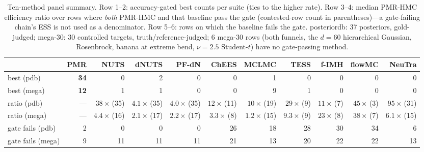 \documentclass[11pt]{article}
\theoremstyle{remark}
\begin{document}
\begin{table}[t]
\caption{Ten-method panel summary. Row 1--2: accuracy-gated best counts
per suite (ties to the higher rate). Row 3--4: median PMR-HMC
efficiency ratio over rows where \emph{both} PMR-HMC and that baseline
pass the gate (contested-row count in parentheses)---a gate-failing
chain's ESS is not used as a denominator. Row 5--6: rows on which the
baseline fails the gate. posteriordb: 37 posteriors, gold-judged;
mega-30: 30 controlled targets, truth/reference-judged; 6 mega-30 rows
(both funnels, the $d{=}60$ hierarchical Gaussian, Rosenbrock, banana
at extreme bend, $\nu{=}2.5$ Student-$t$) have no gate-passing method.}
\label{tab:panelsum}
\centering\scriptsize
\setlength{\tabcolsep}{2.6pt}
\begin{tabular}{lrrrrrrrrrr}
\toprule
 & PMR & NUTS & dNUTS & PF-dN & ChEES & MCLMC & TESS & f-IMH & flowMC & NeuTra\\
\midrule
best (pdb) & \textbf{34} & 0 & 2 & 0 & 0 & 1 & 0 & 0 & 0 & 0\\
best (mega) & \textbf{12} & 1 & 1 & 0 & 0 & 9 & 1 & 0 & 0 & 0\\
ratio (pdb) & --- & $38\times$\,(35) & $4.1\times$\,(35) & $4.0\times$\,(35)
 & $12\times$\,(11) & $10\times$\,(19) & $29\times$\,(9) & $11\times$\,(7)
 & $45\times$\,(3) & $95\times$\,(31)\\
ratio (mega) & --- & $4.4\times$\,(16) & $2.1\times$\,(17) & $2.2\times$\,(17)
 & $3.3\times$\,(8) & $1.2\times$\,(15) & $9.3\times$\,(9) & $23\times$\,(8)
 & $38\times$\,(7) & $6.1\times$\,(15)\\
gate fails (pdb) & 2 & 0 & 0 & 0 & 26 & 18 & 28 & 30 & 34 & 6\\
gate fails (mega) & 9 & 11 & 11 & 11 & 21 & 13 & 20 & 22 & 22 & 13\\
\bottomrule
\end{tabular}
\end{table}
\end{document}
